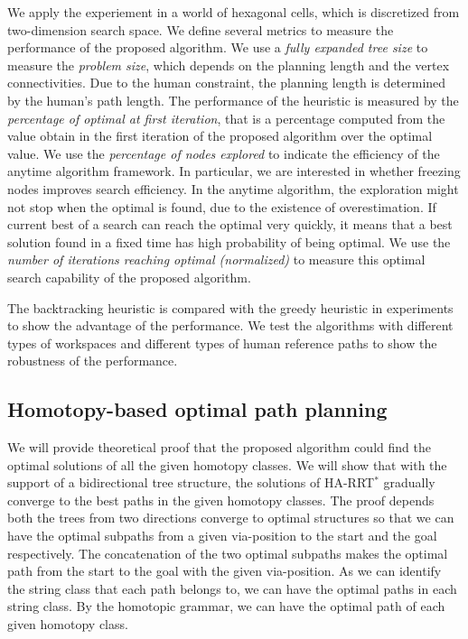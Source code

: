 \documentclass[phd]{byuprop}
\begin{document}
We apply the experiement in a world of hexagonal cells, which is discretized from two-dimension search space.
We define several metrics to measure the performance of the proposed algorithm.
We use a \emph{fully expanded tree size} to measure the \emph{problem size}, which depends on the planning length and the vertex connectivities.
Due to the human constraint, the planning length is determined by the human's path length.
The performance of the heuristic is measured by the \emph{percentage of optimal at first iteration}, that is a percentage computed from the value obtain in the first iteration of the proposed algorithm over the optimal value.
We use the \emph{percentage of nodes explored} to indicate the efficiency of the anytime algorithm framework.
In particular, we are interested in whether freezing nodes improves search efficiency.
In the anytime algorithm, the exploration might not stop when the optimal is found, due to the existence of overestimation.
If current best of a search can reach the optimal very quickly, it means that a best solution found in a fixed time has high probability of being optimal.
We use the \emph{number of iterations reaching optimal (normalized)} to measure this optimal search capability of the proposed algorithm.

The backtracking heuristic is compared with the greedy heuristic in experiments to show the advantage of the performance.
We test the algorithms with different types of workspaces and different types of human reference paths to show the robustness of the performance.


\subsection{Homotopy-based optimal path planning}

We will provide theoretical proof that the proposed algorithm could find the optimal solutions of all the given homotopy classes.
We will show that with the support of a bidirectional tree structure, the solutions of HA-RRT$^{*}$ gradually converge to the best paths in the given homotopy classes.
The proof depends both the trees from two directions converge to optimal structures so that we can have the optimal subpaths from a given via-position to the start and the goal respectively.
The concatenation of the two optimal subpaths makes the optimal path from the start to the goal with the given via-position.
As we can identify the string class that each path belongs to, we can have the optimal paths in each string class.
By the homotopic grammar, we can have the optimal path of each given homotopy class.
\end{document}
